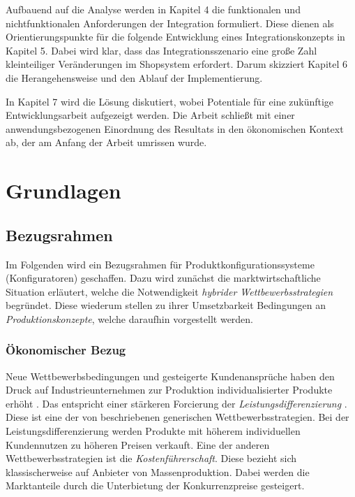 \documentclass[11pt, a4paper, titlepage, listof=totoc, bibliography=totoc, index=totoc, twoside, openright, headings=normal, draft]{scrreprt}
\begin{document}
Aufbauend auf die Analyse werden in Kapitel 4 die funktionalen und nichtfunktionalen Anforderungen der Integration formuliert. Diese dienen als Orientierungspunkte für die folgende Entwicklung eines Integrationskonzepts in Kapitel 5. Dabei wird klar, dass das Integrationsszenario eine große Zahl kleinteiliger Veränderungen im Shopsystem erfordert. Darum skizziert Kapitel 6 die Herangehensweise und den Ablauf der Implementierung.

In Kapitel 7 wird die Lösung diskutiert, wobei Potentiale für eine zukünftige Entwicklungsarbeit aufgezeigt werden. Die Arbeit schließt mit einer anwendungsbezogenen Einordnung des Resultats in den ökonomischen Kontext ab, der am Anfang der Arbeit umrissen wurde.


\pagebreak

\chapter{Grundlagen}
\label{Grundlagen}
\section{Bezugsrahmen}
Im Folgenden wird ein Bezugsrahmen für Produktkonfigurationssysteme (Konfiguratoren) geschaffen. Dazu wird zunächst die marktwirtschaftliche Situation erläutert, welche die Notwendigkeit \emph{hybrider Wettbewerbsstrategien} begründet. Diese wiederum stellen zu ihrer Umsetzbarkeit Bedingungen an \emph{Produktionskonzepte}, welche daraufhin vorgestellt werden.

\subsection{Ökonomischer Bezug}
\label{oekonomischerBezug}
Neue Wettbewerbsbedingungen und gesteigerte Kundenansprüche haben den Druck auf Industrieunternehmen zur Produktion individualisierter Produkte erhöht \citep{piller98}. Das entspricht einer stärkeren Forcierung der \emph{Leistungsdifferenzierung} \citep{lutz11}. Diese ist eine der von \citet{porter02} beschriebenen \glqq generischen Wettbewerbsstrategien\grqq{}. Bei der Leistungsdifferenzierung werden Produkte mit höherem individuellen Kundennutzen zu höheren Preisen verkauft. Eine der anderen Wettbewerbsstrategien ist die \emph{Kostenführerschaft}. Diese bezieht sich klassischerweise auf Anbieter von Massenproduktion. Dabei werden die Marktanteile durch die Unterbietung der Konkurrenzpreise gesteigert.
\end{document}
